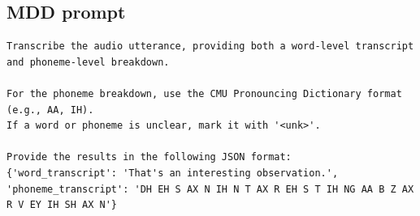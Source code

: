 \documentclass[sigconf,nonacm]{acmart}
\begin{document}
\subsection{MDD prompt} \label{app:mdd}
\begin{lstlisting}
Transcribe the audio utterance, providing both a word-level transcript and phoneme-level breakdown.

For the phoneme breakdown, use the CMU Pronouncing Dictionary format (e.g., AA, IH).
If a word or phoneme is unclear, mark it with '<unk>'.

Provide the results in the following JSON format:
{'word_transcript': 'That's an interesting observation.', 'phoneme_transcript': 'DH EH S AX N IH N T AX R EH S T IH NG AA B Z AX R V EY IH SH AX N'}
\end{lstlisting}



\newpage

% 

\end{document}
